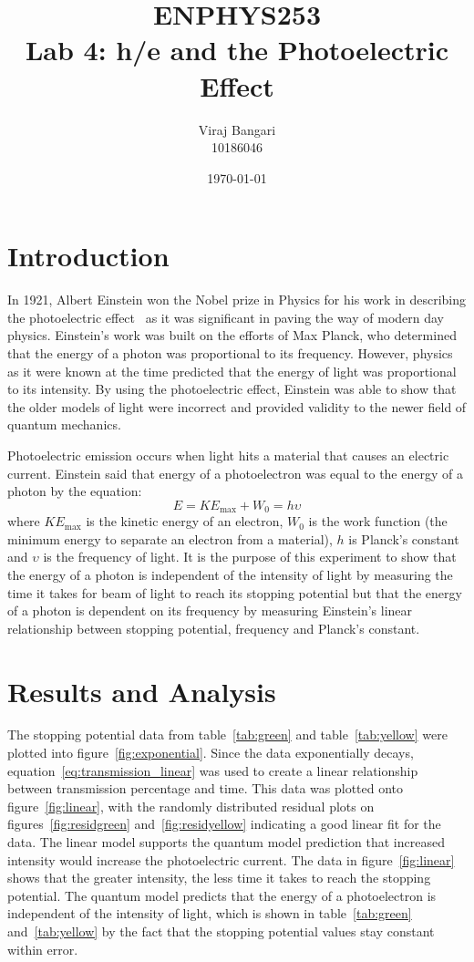 \documentclass[]{article}
\title{ENPHYS253 \\ Lab 4: h/e and the Photoelectric Effect}
\author{Viraj Bangari \\ 10186046}
\date{\today}
\begin{document}
 
\maketitle

\section{Introduction}
In 1921, Albert Einstein won the Nobel prize in Physics for his work in
describing the photoelectric effect~\cite{ref:nobel} as it was significant in
paving the way of modern day physics. Einstein's work was built on the efforts
of Max Planck, who determined that the energy of a photon was proportional to
its frequency. However, physics as it were known at the time predicted that the
energy of light was proportional to its intensity. By using the photoelectric
effect, Einstein was able to show that the older models of light were incorrect
and provided validity to the newer field of quantum mechanics.

Photoelectric emission occurs when light hits a material that causes an electric
current. Einstein said that energy of a photoelectron was equal to the energy of
a photon by the equation: \begin{equation}\label{eq:einstein} 
    E  = KE_{\max} + W_{0} = h\upsilon 
\end{equation} where $KE_{\max}$ is the kinetic energy of an
electron, $W_{0}$ is the work function (the minimum energy to separate an
electron from a material), $h$ is Planck's constant and $\upsilon$ is the
frequency of light. It is the purpose of this experiment to show that the energy
of a photon is independent of the intensity of light by measuring the time it
takes for beam of light to reach its stopping potential but that the energy of a
photon is dependent on its frequency by measuring Einstein's linear relationship
between stopping potential, frequency and Planck's constant.

\section{Results and Analysis}
The stopping potential data from table~\ref{tab:green} and
table~\ref{tab:yellow} were plotted into figure~\ref{fig:exponential}.  Since
the data exponentially decays, equation~\ref{eq:transmission_linear} was used to
create a linear relationship between transmission percentage and time.  This
data was plotted onto figure~\ref{fig:linear}, with the randomly distributed
residual plots on figures~\ref{fig:residgreen} and~\ref{fig:residyellow}
indicating a good linear fit for the data. The linear model supports the quantum
model prediction that increased intensity would increase the photoelectric current.
The data in figure~\ref{fig:linear} shows that the greater intensity, the less
time it takes to reach the stopping potential. The quantum model predicts that
the energy of a photoelectron is independent of the intensity of light, which is shown
in table~\ref{tab:green} and~\ref{tab:yellow} by the fact that the stopping
potential values stay constant within error.
\end{document}
